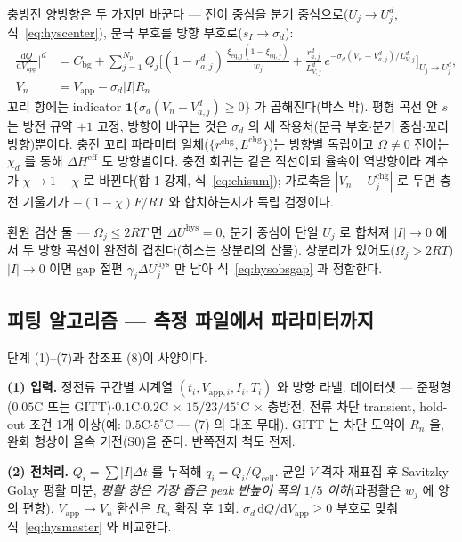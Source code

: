 \documentclass[11pt,a4paper]{article}
\newcommand{\dd}{\mathrm{d}}
\newcommand{\eff}{\mathrm{eff}}
\newcommand{\eq}{\mathrm{eq}}
\newcommand{\app}{\mathrm{app}}
\newcommand{\cell}{\mathrm{cell}}
\newcommand{\bg}{\mathrm{bg}}
\newcommand{\chg}{\mathrm{chg}}
\newcommand{\hys}{\mathrm{hys}}
\begin{document}
충방전 양방향은 두 가지만 바꾼다 — 전이 중심을 분기 중심으로($U_j\to U_j^{d}$, 식~\eqref{eq:hyscenter}), 분극 부호를 방향 부호로($s_I\to\sigma_d$):
\begin{equation}
\boxed{\;\begin{aligned}\frac{\dd Q}{\dd V_\app}\Big|^{d}&=C_\bg+\sum_{j=1}^{N_p}Q_j\bigg[
(1-r_{a,j}^d)\,\frac{\xi_{\eq,j}(1-\xi_{\eq,j})}{w_j}
+\frac{r_{a,j}^d}{L_{V,j}^d}\,e^{-\sigma_d(V_n-V_{a,j}^d)/L_{V,j}^d}\bigg]_{U_j\to U_j^{d}},\\[2pt]
V_n&=V_\app-\sigma_d|I|R_n\end{aligned}\;}
\label{eq:hysmaster}
\end{equation}
꼬리 항에는 indicator $\mathbf 1\{\sigma_d(V_n-V_{a,j}^d)\ge0\}$ 가 곱해진다(박스 밖). 평형 곡선 안 $s$ 는 방전 규약 $+1$ 고정, 방향이 바꾸는 것은 $\sigma_d$ 의 세 작용처(분극 부호$\cdot$분기 중심$\cdot$꼬리 방향)뿐이다. 충전 꼬리 파라미터 일체($\{r^{\chg},L^{\chg}\}$)는 방향별 독립이고 $\Omega\ne0$ 전이는 $\chi_d$ 를 통해 $\Delta H^{\eff}$ 도 방향별이다. 충전 회귀는 같은 직선이되 율속이 역방향이라 계수가 $\chi\to1-\chi$ 로 바뀐다(합-1 강제, 식~\eqref{eq:chisum}); 가로축을 $|V_n-U_j^{\chg}|$ 로 두면 충전 기울기가 $-(1-\chi)F/RT$ 와 합치하는지가 독립 검정이다.

환원 검산 둘 — $\Omega_j\le2RT$ 면 $\Delta U^\hys=0$, 분기 중심이 단일 $U_j$ 로 합쳐져 $|I|\to0$ 에서 두 방향 곡선이 완전히 겹친다(히스는 상분리의 산물). 상분리가 있어도($\Omega_j>2RT$) $|I|\to0$ 이면 gap 절편 $\gamma_j\Delta U_j^\hys$ 만 남아 식~\eqref{eq:hysobsgap} 과 정합한다.

\subsection{피팅 알고리즘 — 측정 파일에서 파라미터까지}
단계 (1)--(7)과 참조표 (8)이 사양이다.

\textbf{(1) 입력.} 정전류 구간별 시계열 $(t_i,V_{\app,i},I_i,T_i)$ 와 방향 라벨. 데이터셋 — 준평형($0.05$C 또는 GITT)$\cdot$$0.1$C$\cdot$$0.2$C $\times$ $15/23/45^\circ$C $\times$ 충방전, 전류 차단 transient, hold-out 조건 1개 이상(예: $0.5$C$\cdot$$5^\circ$C — (7) 의 대조 무대). GITT \cite{weppner1977}는 차단 도약이 $R_n$ 을, 완화 형상이 율속 기전(S0)을 준다. 반쪽전지 척도 전제.

\textbf{(2) 전처리.} $Q_i=\sum|I|\Delta t$ 를 누적해 $q_i=Q_i/Q_\cell$. 균일 $V$ 격자 재표집 후 Savitzky--Golay 평활 미분, \emph{평활 창은 가장 좁은 peak 반높이 폭의 $1/5$ 이하}(과평활은 $w_j$ 에 양의 편향). $V_\app\to V_n$ 환산은 $R_n$ 확정 후 1회. $\sigma_d\,\dd Q/\dd V_\app\ge0$ 부호로 맞춰 식~\eqref{eq:hysmaster} 와 비교한다.
\end{document}
